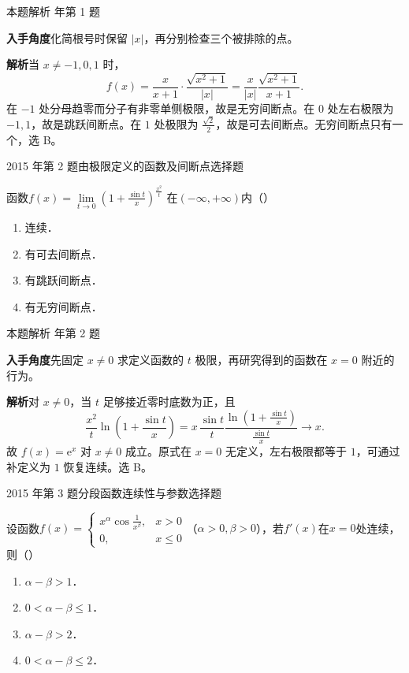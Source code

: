 \documentclass[UTF8,zihao=-4,fontset=fandol]{ctexart}
\renewcommand{\lim}{\operatorname*{lim}\limits}
\newcommand{\pickout}{\hfill（\hspace{1.4em}）}
\newenvironment{abcd}{\begin{enumerate}[label=\textup{(\Alph*)},leftmargin=2.3em,itemsep=1pt,topsep=4pt,parsep=1pt]}{\end{enumerate}}
\newcommand{\QuestionPage}[6]{%
  \par\noindent\begin{minipage}{\linewidth}
  \raggedright
  {\small\textcolor{black!60}{#3\quad #5}\hfill\textcolor{accent}{#2}}\par\smallskip}
\newcommand{\QuestionEnd}{\end{minipage}\par\medskip}
\newcommand{\QuestionPage}[6]{%
  \clearpage
  {\small\textcolor{accent}{#1\hfill #2}}\par\medskip
  {\small\textcolor{black!60}{#3\quad #5\hfill #6}}\par\vspace{9bp}}
\newcommand{\QuestionEnd}{}
\newenvironment{QuestionSolution}[1]{%
  \clearpage
  {\small\textcolor{black!60}{本题解析\quad #1}}\par\medskip
}{\par\clearpage}
\begin{document}
\begin{QuestionSolution}{2010 年第 1 题}
\textbf{入手角度}\quad 化简根号时保留 \(|x|\)，再分别检查三个被排除的点。

\textbf{解析}\quad 当 \(x\ne-1,0,1\) 时，
\[
f(x)=\frac{x}{x+1}\cdot\frac{\sqrt{x^2+1}}{|x|}
=\frac{x}{|x|}\frac{\sqrt{x^2+1}}{x+1}.
\]
在 \(-1\) 处分母趋零而分子有非零单侧极限，故是无穷间断点。在 \(0\) 处左右极限为 \(-1,1\)，故是跳跃间断点。在 \(1\) 处极限为 \(\frac{\sqrt2}{2}\)，故是可去间断点。无穷间断点只有一个，选 B。
\end{QuestionSolution}

\QuestionPage{1.5 连续函数}{选择题}{2015 年第 2 题}{1}{由极限定义的函数及间断点}{042 / 234}
函数$f(x) = \lim_{t \to 0} \left(1 + \frac{\sin t}{x} \right)^{\frac{x^2}{t}}$
在$(-\infty , +\infty)$内\pickout{}
\begin{abcd}
\item 连续．
\item 有可去间断点．
\item 有跳跃间断点．
\item 有无穷间断点．
\end{abcd}
\QuestionEnd

\begin{QuestionSolution}{2015 年第 2 题}
\textbf{入手角度}\quad 先固定 \(x\ne0\) 求定义函数的 \(t\) 极限，再研究得到的函数在 \(x=0\) 附近的行为。

\textbf{解析}\quad 对 \(x\ne0\)，当 \(t\) 足够接近零时底数为正，且
\[
\frac{x^2}{t}\ln\left(1+\frac{\sin t}{x}\right)
=x\,\frac{\sin t}{t}
\frac{\ln\!\left(1+\frac{\sin t}{x}\right)}{\frac{\sin t}{x}}\longrightarrow x.
\]
故 \(f(x)=\mathrm{e}^x\) 对 \(x\ne0\) 成立。原式在 \(x=0\) 无定义，左右极限都等于 \(1\)，可通过补定义为 \(1\) 恢复连续。选 B。
\end{QuestionSolution}

\QuestionPage{1.5 连续函数}{选择题}{2015 年第 3 题}{1}{分段函数连续性与参数}{043 / 234}
设函数$f(x) = \begin{cases}
  x^{\alpha}\cos \frac{1}{x^{\beta}}, & x > 0 \\
                                   0, & x \le 0
\end{cases}$（$\alpha > 0,\beta > 0$），若$f'(x)$在$x = 0$处连续，则\pickout{}
\begin{abcd}
\item $\alpha - \beta > 1$．
\item $0 < \alpha - \beta \le 1$．
\item $\alpha - \beta > 2$．
\item $0 < \alpha - \beta \le 2$．
\end{abcd}
\QuestionEnd
\end{document}
